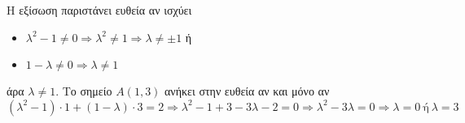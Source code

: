 Η εξίσωση παριστάνει ευθεία αν ισχύει
\begin{itemize}
\item $\lambda^2-1\neq 0\Rightarrow \lambda^2\neq 1\Rightarrow \lambda\neq\pm 1$ ή
\item $1-\lambda\neq 0\Rightarrow \lambda\neq 1$
\end{itemize}
άρα $ \lambda\neq 1 $. Το σημείο $ A(1,3) $ ανήκει στην ευθεία αν και μόνο αν
\[ \left(\lambda^2-1\right)\cdot 1+(1-\lambda)\cdot 3=2\Rightarrow \lambda^2-1+3-3\lambda-2=0\Rightarrow \lambda^2-3\lambda=0\Rightarrow \lambda=0\ \text{ή}\ \lambda=3 \]
